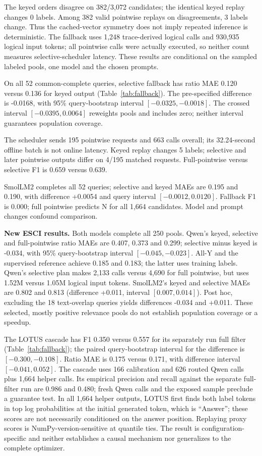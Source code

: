 \documentclass[conference]{IEEEtran}
\begin{document}
The keyed orders disagree on 382/3,072 candidates; the identical keyed replay changes 0 labels. Among 382 valid pointwise replays on disagreements, 3 labels change. Thus the cached-vector symmetry does not imply repeated inference is deterministic. The fallback uses 1,248 trace-derived logical calls and 930,935 logical input tokens; all pointwise calls were actually executed, so neither count measures selective-scheduler latency. These results are conditional on the sampled labeled pools, one model and the chosen prompts.

On all 52 common-complete queries, selective fallback has ratio MAE 0.120 versus 0.136 for keyed output (Table~\ref{tab:fallback}). The pre-specified difference is -0.0168, with 95\% query-bootstrap interval $[-0.0325,-0.0018]$. The crossed interval $[-0.0395,0.0064]$ reweights pools and includes zero; neither interval guarantees population coverage.

The scheduler sends 195 pointwise requests and 663 calls overall; its 32.24-second offline batch is not online latency. Keyed replay changes 5 labels; selective and later pointwise outputs differ on 4/195 matched requests. Full-pointwise versus selective F1 is 0.659 versus 0.639.

SmolLM2 completes all 52 queries; selective and keyed MAEs are 0.195 and 0.190, with difference +0.0054 and query interval $[-0.0012,0.0120]$. Fallback F1 is 0.000; full pointwise predicts N for all 1,664 candidates. Model and prompt changes confound comparison.

\textbf{New ESCI results.} Both models complete all 250 pools. Qwen's keyed, selective and full-pointwise ratio MAEs are 0.407, 0.373 and 0.299; selective minus keyed is -0.034, with 95\% query-bootstrap interval $[-0.045,-0.023]$. All-Y and the supervised reference achieve 0.185 and 0.183; the latter uses training labels. Qwen's selective plan makes 2,133 calls versus 4,690 for full pointwise, but uses 1.52M versus 1.05M logical input tokens. SmolLM2's keyed and selective MAEs are 0.802 and 0.813 (difference +0.011, interval $[0.007,0.014]$). Post hoc, excluding the 18 text-overlap queries yields differences -0.034 and +0.011. These selected, mostly positive relevance pools do not establish population coverage or a speedup.

The LOTUS cascade has F1 0.350 versus 0.557 for its separately run full filter (Table~\ref{tab:fallback}); the paired query-bootstrap interval for the difference is $[-0.300,-0.108]$. Ratio MAE is 0.175 versus 0.171, with difference interval $[-0.041,0.052]$. The cascade uses 166 calibration and 626 routed Qwen calls plus 1,664 helper calls. Its empirical precision and recall against the separate full-filter run are 0.986 and 0.480; fresh Qwen calls and the exposed sample preclude a guarantee test. In all 1,664 helper outputs, LOTUS first finds both label tokens in top log probabilities at the initial generated token, which is ``Answer''; these scores are not necessarily conditioned on the answer position. Replaying proxy scores is NumPy-version-sensitive at quantile ties. The result is configuration-specific and neither establishes a causal mechanism nor generalizes to the complete optimizer.
\end{document}
